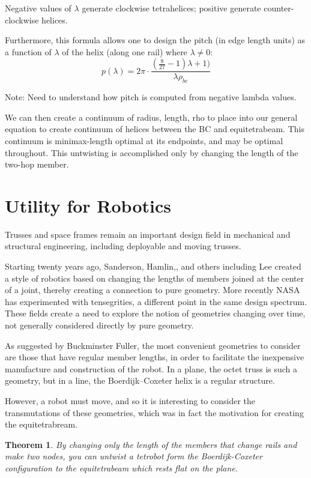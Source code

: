 \documentclass[11pt]{article}
\newtheorem{theorem}{Theorem}
\begin{document}
Negative values of $\lambda$ generate clockwise tetrahelices; positive generate counter-clockwise helices.

Furthermore, this formula allows one to design the pitch (in edge length units) as a function of $\lambda$ of the helix (along one rail)
where $\lambda \neq 0$:
\[
p(\lambda) = 2 \pi  \cdot \frac{(\frac{8}{27} -1) \lambda +1)}{ \lambda  \rho_{bc} }
\]

Note: Need to understand how pitch is computed from negative lambda values.

We can then create a continuum of radius, length, rho to place into our general equation
to create continuum of helices between the BC and equitetrabeam. This continuum is 
minimax-length optimal at its endpoints, and may be optimal throughout. This untwisting is accomplished
only by changing the length of the two-hop member.

\section{Utility for Robotics}

Trusses and space frames remain an important design field in mechanical and structural engineering\cite{mikulas1985sequentially},
including deployable and moving trusses\cite{claypool2012readily}.

Starting twenty years ago, Sanderson\cite{sanderson1996modular}, Hamlin,\cite{TetrobotBook}, and others including Lee\cite{lee2002dynamic}
created a style of robotics based on changing the lengths of members
joined at the center of a joint, thereby creating a connection to pure geometry. More recently NASA has experimented with
tensegrities\cite{NTRT}, a different point in the same design spectrum. These fields create a need to explore the notion of
geometries changing over time, not generally considered directly by pure geometry.

As suggested by Buckminster Fuller, the most convenient geometries to consider are those that have regular member
lengths, in order to facilitate the inexpensive manufacture and construction of the robot.  In a plane, the octet truss
is such a geometry, but in a line, the Boerdijk--Coxeter helix is a regular structure.

However, a robot must move, and so it is interesting to consider the transmutations of these geometries, which was in
fact the motivation for creating the equitetrabream.

\begin{theorem}
  By changing only the length of the members that change rails and make two nodes, you can untwist a tetrobot
  form the Boerdijk-Coxeter configuration to the equitetrabeam which rests flat on the plane.
\end{theorem}
\end{document}
